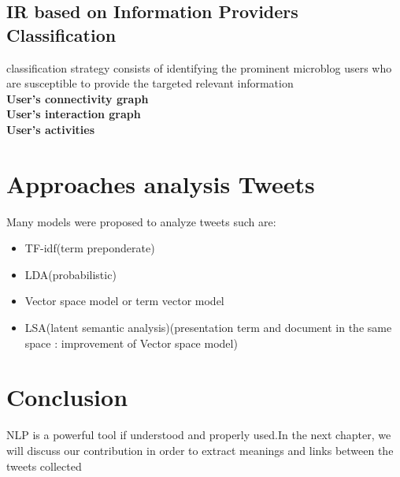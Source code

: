 \subsection{IR based on Information Providers Classification}
classification strategy consists of identifying the prominent microblog
users who are susceptible to provide the targeted relevant information
\\
\textbf{User's connectivity graph}
\\
\textbf{User's interaction graph}
\\
\textbf{User's activities}
\section{Approaches analysis Tweets}
Many models were proposed to analyze tweets such are:
\begin{itemize}
\item TF-idf(term preponderate)
\item LDA(probabilistic)
\item Vector space model or term vector model
\item LSA(latent semantic analysis)(presentation term and document in the same space : improvement of Vector space model)
\end{itemize}
\section{Conclusion}
NLP is a powerful tool if understood and properly used.In the next chapter, we will discuss our contribution in order to extract meanings and links between the tweets collected




